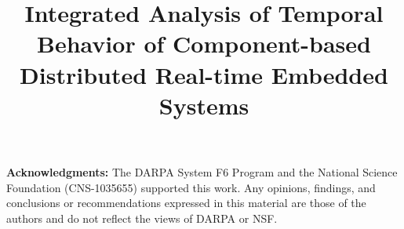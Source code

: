 \documentclass[10pt,conference]{IEEEtran}
\begin{document}
\title{Integrated Analysis of Temporal Behavior of Component-based Distributed Real-time Embedded Systems }
\vspace{-0.1in}
\author{ 
}

 
\setcounter{page}{1}
\maketitle










\textbf{Acknowledgments:} The DARPA System F6 Program and the National
Science Foundation (CNS-1035655) supported
this work. Any opinions, findings, and conclusions or recommendations expressed
in this material are those of the authors and do not reflect the views of
DARPA or NSF. 
\balance
\begin{spacing}{0.88}


\end{spacing}
\end{document}
